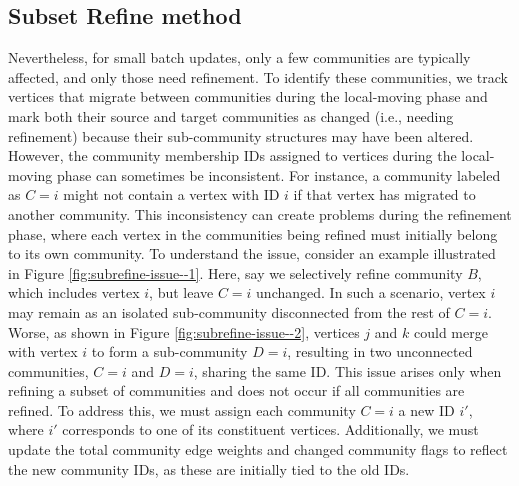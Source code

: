 \subsection{Subset Refine method}
\label{sec:subset-refine-method}

Nevertheless, for small batch updates, only a few communities are typically affected, and only those need refinement. To identify these communities, we track vertices that migrate between communities during the local-moving phase and mark both their source and target communities as changed (i.e., needing refinement) because their sub-community structures may have been altered. However, the community membership IDs assigned to vertices during the local-moving phase can sometimes be inconsistent. For instance, a community labeled as $C = i$ might not contain a vertex with ID $i$ if that vertex has migrated to another community. This inconsistency can create problems during the refinement phase, where each vertex in the communities being refined must initially belong to its own community. To understand the issue, consider an example illustrated in Figure \ref{fig:subrefine-issue--1}. Here, say we selectively refine community $B$, which includes vertex $i$, but leave $C = i$ unchanged. In such a scenario, vertex $i$ may remain as an isolated sub-community disconnected from the rest of $C = i$. Worse, as shown in Figure \ref{fig:subrefine-issue--2}, vertices $j$ and $k$ could merge with vertex $i$ to form a sub-community $D = i$, resulting in two unconnected communities, $C = i$ and $D = i$, sharing the same ID. This issue arises only when refining a subset of communities and does not occur if all communities are refined. To address this, we must assign each community $C = i$ a new ID $i'$, where $i'$ corresponds to one of its constituent vertices. Additionally, we must update the total community edge weights and changed community flags to reflect the new community IDs, as these are initially tied to the old IDs.



